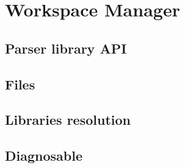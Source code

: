 \chapter{Workspace Manager}

\section{Parser library API}

\section{Files}

\section{Libraries resolution}

\section{Diagnosable}
